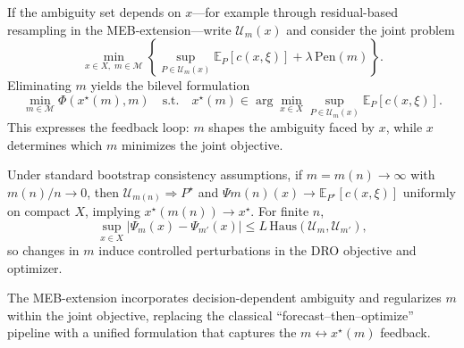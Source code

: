 \documentclass[a4paper,fleqn,3p,11pt,authoryear]{cas-sc}
\begin{document}
If the ambiguity set depends on $x$—for example through residual-based resampling in the MEB-extension—write $\mathcal{U}_m(x)$ and consider the joint problem
\begin{equation}
	\min_{x\in X,\; m\in\mathcal{M}}
	\left\{
	\sup_{P\in\mathcal{U}_m(x)} \mathbb{E}_P[c(x,\xi)]
	+ \lambda\,\mathrm{Pen}(m)
	\right\}.
\end{equation}
Eliminating $m$ yields the bilevel formulation
\begin{equation}
	\min_{m\in\mathcal{M}} 
	\Phi(x^\star(m),m)
	\quad\text{s.t.}\quad
	x^\star(m)\in\arg\min_{x\in X}
	\sup_{P\in\mathcal{U}_m(x)}\mathbb{E}_P[c(x,\xi)].
\end{equation}
This expresses the feedback loop: $m$ shapes the ambiguity faced by $x$, while $x$ determines which $m$ minimizes the joint objective.

Under standard bootstrap consistency assumptions, if $m=m(n)\to\infty$ with $m(n)/n\to 0$, then $\mathcal{U}_{m(n)}\Rightarrow P^\star$ and $\Psi{m(n)}(x)\to\mathbb{E}_{P^\star}[c(x,\xi)]$ uniformly on compact $X$, implying $x^\star(m(n))\to x^\star$. For finite $n$,
\begin{equation}
	\sup_{x\in X}\big|\Psi_m(x)-\Psi_{m'}(x)\big|
	\le 
	L\,\mathrm{Haus}\!\left(\mathcal{U}_m,\mathcal{U}_{m'}\right),
\end{equation}
so changes in $m$ induce controlled perturbations in the DRO objective and optimizer.

The MEB-extension incorporates decision-dependent ambiguity and regularizes $m$ within the joint objective, replacing the classical ``forecast--then--optimize'' pipeline with a unified formulation that captures the $m\leftrightarrow x^\star(m)$ feedback.

%		
%		
%		
%		
%		
\end{document}
